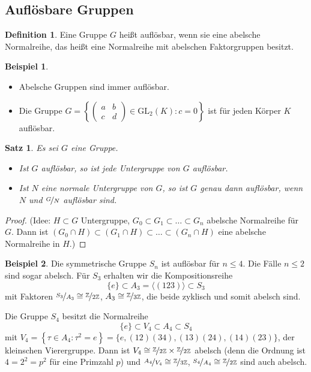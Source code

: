 \documentclass[12pt]{scrartcl} %
\newtheorem{thm}{Satz}[section]
\theoremstyle{definition}
\newtheorem*{defn}{Definition}
\newtheorem{ex}{Beispiel}
\theoremstyle{remark}
\begin{document}
\subsection{Auflösbare Gruppen}

\begin{defn}
	Eine Gruppe $G$ heißt auflösbar, wenn sie eine abelsche Normalreihe, das heißt eine Normalreihe mit abelschen Faktorgruppen besitzt.
\end{defn}

\begin{ex}
	\begin{itemize}
		\item Abelsche Gruppen sind immer auflösbar.
		\item Die Gruppe $G=\left\{\begin{pmatrix}
			a & b \\
			c & d \end{pmatrix} \in \text{GL}_2(K):c=0\right\}$ ist für jeden Körper $K$ auflösbar.
	\end{itemize}
\end{ex}

\begin{thm}
	Es sei $G$ eine Gruppe.
	\begin{itemize}
		\item Ist $G$ auflösbar, so ist jede Untergruppe von $G$ auflösbar.
		\item Ist $N$ eine normale Untergruppe von $G$, so ist $G$ genau dann auflösbar, wenn $N$ und $\nicefrac{G}{N}$ auflösbar sind.
	\end{itemize}
\end{thm}

\begin{proof}
	(Idee: $H\subset G$ Untergruppe, $G_0\subset G_1\subset\dots\subset G_n$ abelsche Normalreihe für $G$. Dann ist $(G_0\cap H)\subset(G_1\cap H)\subset\dots\subset(G_n\cap H)$ eine abelsche Normalreihe in $H$.)
\end{proof}

\begin{ex}
	Die symmetrische Gruppe $S_n$ ist auflösbar für $n\leq 4$. Die Fälle $n\leq 2$ sind sogar abelsch. Für $S_3$ erhalten wir die Kompositionsreihe
		\[\{e\}\subset A_3=\langle(123)\rangle\subset S_3\]
	mit Faktoren $\nicefrac{S_3}{A_3}\cong\nicefrac{\mathbb{Z}}{2\mathbb{Z}}$, $A_3\cong\nicefrac{\mathbb{Z}}{3\mathbb{Z}}$, die beide zyklisch und somit abelsch sind.
	
	Die Gruppe $S_4$ besitzt die Normalreihe
		\[\{e\}\subset V_4\subset A_4\subset S_4\]
	mit $V_4=\left\{\tau\in A_4:\tau^2=e\right\}=\{e,(12)(34),(13)(24),(14)(23)\}$, der kleinschen Vierergruppe. Dann ist $V_4\cong\nicefrac{\mathbb{Z}}{2\mathbb{Z}}\times\nicefrac{\mathbb{Z}}{2\mathbb{Z}}$ abelsch (denn die Ordnung ist $4=2^2=p^2$ für eine Primzahl $p$) und $\nicefrac{A_4}{V_4}\cong\nicefrac{\mathbb{Z}}{3\mathbb{Z}}$, $\nicefrac{S_4}{A_4}\cong\nicefrac{\mathbb{Z}}{2\mathbb{Z}}$ sind auch abelsch.
\end{ex}
\end{document}
